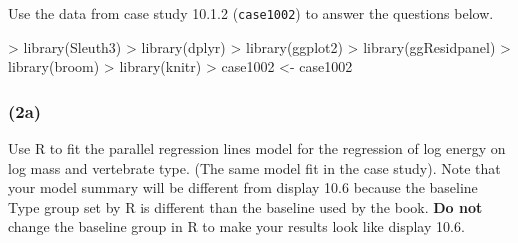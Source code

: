 \documentclass[
]{article}
\newenvironment{Shaded}{\begin{snugshade}}{\end{snugshade}}
\newcommand{\FunctionTok}[1]{\textcolor[rgb]{0.00,0.00,0.00}{#1}}
\newcommand{\NormalTok}[1]{#1}
\newcommand{\OtherTok}[1]{\textcolor[rgb]{0.56,0.35,0.01}{#1}}
\newcommand{\SpecialCharTok}[1]{\textcolor[rgb]{0.00,0.00,0.00}{#1}}
\begin{document}
Use the data from case study 10.1.2 (\texttt{case1002}) to answer the
questions below.

\begin{Shaded}
\begin{Highlighting}[]
\SpecialCharTok{\textgreater{}} \FunctionTok{library}\NormalTok{(Sleuth3)}
\SpecialCharTok{\textgreater{}} \FunctionTok{library}\NormalTok{(dplyr)}
\SpecialCharTok{\textgreater{}} \FunctionTok{library}\NormalTok{(ggplot2)}
\SpecialCharTok{\textgreater{}} \FunctionTok{library}\NormalTok{(ggResidpanel)}
\SpecialCharTok{\textgreater{}} \FunctionTok{library}\NormalTok{(broom)}
\SpecialCharTok{\textgreater{}} \FunctionTok{library}\NormalTok{(knitr)}
\SpecialCharTok{\textgreater{}}\NormalTok{ case1002 }\OtherTok{\textless{}{-}}\NormalTok{ case1002}
\end{Highlighting}
\end{Shaded}

\hypertarget{a}{%
\subsubsection{(2a)}\label{a}}

Use R to fit the parallel regression lines model for the regression of
log energy on log mass and vertebrate type. (The same model fit in the
case study). Note that your model summary will be different from display
10.6 because the baseline Type group set by R is different than the
baseline used by the book. \textbf{Do not} change the baseline group in
R to make your results look like display 10.6.
\end{document}
